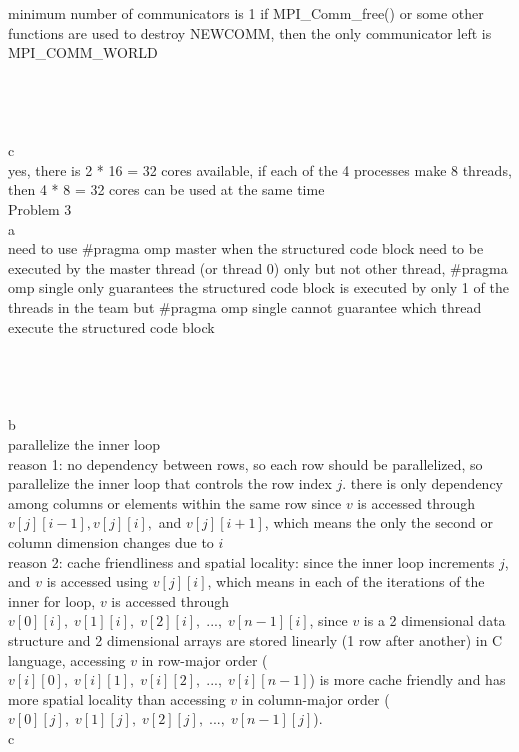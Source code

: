 \documentclass[12pt,border=4pt,multi]{article} %
\begin{document}
minimum number of communicators is 1 if MPI\_Comm\_free() or some other functions are used to destroy NEWCOMM, then the only communicator left is MPI\_COMM\_WORLD\\
\\
\\
\\
\\
c\\
yes, there is 2 * 16 = 32 cores available, if each of the 4 processes make 8 threads, then 4 * 8 = 32 cores can be used at the same time\\
\newpage
\noindent
Problem 3\\
a\\
need to use #pragma omp master when the structured code block need to be executed by the master thread (or thread 0) only but not other thread, #pragma omp single only guarantees the structured code block is executed by only 1 of the threads in the team but #pragma omp single cannot guarantee which thread execute the structured code block\\ 
\\
\\
\\
\\
b\\
parallelize the inner loop\\
reason 1: no dependency between rows, so each row should be parallelized, so parallelize the inner loop that controls the row index $j$. there is only dependency among columns or elements within the same row since $v$ is accessed through $v[j][i-1], v[j][i],$ and $v[j][i+1]$, which means the only the second or column dimension changes due to $i$\\
reason 2: cache friendliness and spatial locality: since the inner loop increments $j$, and $v$ is accessed using $v[j][i]$, which means in each of the iterations of the inner for loop, $v$ is accessed through $v[0][i],\; v[1][i],\; v[2][i],\;...,\; v[n - 1][i]$, since $v$ is a 2 dimensional data structure and 2 dimensional arrays are stored linearly (1 row after another) in C language, accessing $v$ in row-major order ($v[i][0],\; v[i][1],\; v[i][2],\;...,\; v[i][n - 1]$) is more cache friendly and has more spatial locality than accessing $v$ in column-major order ($v[0][j],\; v[1][j],\; v[2][j],\;...,\; v[n - 1][j]$). \\
\newpage
\noindent
c
\end{document}
